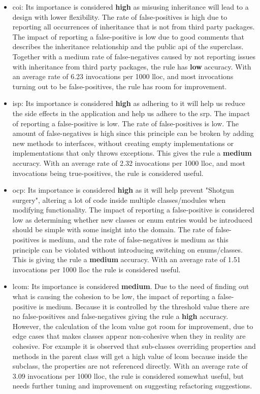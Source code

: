 \documentclass{report}
\begin{document}
\begin{itemize}

    \item \gls{coi}: Its importance is considered \textbf{high} as misusing inheritance will lead to a design with lower flexibility. The rate of false-positives is high due to reporting all occurrences of inheritance that is not from third party packages. The impact of reporting a false-positive is low due to good comments that describes the inheritance relationship and the public \gls{api} of the superclass. Together with a medium rate of false-negatives caused by not reporting issues with inheritance from third party packages, the rule has \textbf{low} accuracy. With an average rate of 6.23 invocations per 1000 \gls{lloc}, and most invocations turning out to be false-positives, the rule has room for improvement. 

    \item \gls{isp}: Its importance is considered \textbf{high} as adhering to it will help us reduce the side effects in the application and help us adhere to the \gls{srp}. The impact of reporting a false-positive is low. The rate of false-positives is low. The amount of false-negatives is high since this principle can be broken by adding new methods to interfaces, without creating empty implementations or implementations that only throws exceptions. This gives the rule a \textbf{medium} accuracy. With an average rate of 2.32 invocations per 1000 \gls{lloc}, and most invocations being true-positives, the rule is considered useful.
    
    \item \gls{ocp}: Its importance is considered \textbf{high} as it will help prevent "Shotgun surgery", altering a lot of code inside multiple classes/modules when modifying functionality. The impact of reporting a false-positive is considered low as determining whether new classes or enum entries would be introduced should be simple with some insight into the domain. The rate of false-positives is medium, and the rate of false-negatives is medium as this principle can be violated without introducing switching on enums/classes. This is giving the rule a \textbf{medium} accuracy. With an average rate of 1.51 invocations per 1000 \gls{lloc} the rule is considered useful.
    
    \item \gls{lcom}: Its importance is considered \textbf{medium}. Due to the need of finding out what is causing the cohesion to be low, the impact of reporting a false-positive is medium. Because it is controlled by the threshold value there are no false-positives and false-negatives giving the rule a \textbf{high} accuracy. However, the calculation of the \gls{lcom} value got room for improvement, due to edge cases that makes classes appear non-cohesive when they in reality are cohesive. For example it is observed that sub-classes overriding properties and methods in the parent class will get a high value of \gls{lcom} because inside the subclass, the properties are not referenced directly. With an average rate of 3.09 invocations per 1000 \gls{lloc}, the rule is considered somewhat useful, but needs further tuning and improvement on suggesting refactoring suggestions. 


\end{itemize}
\end{document}
